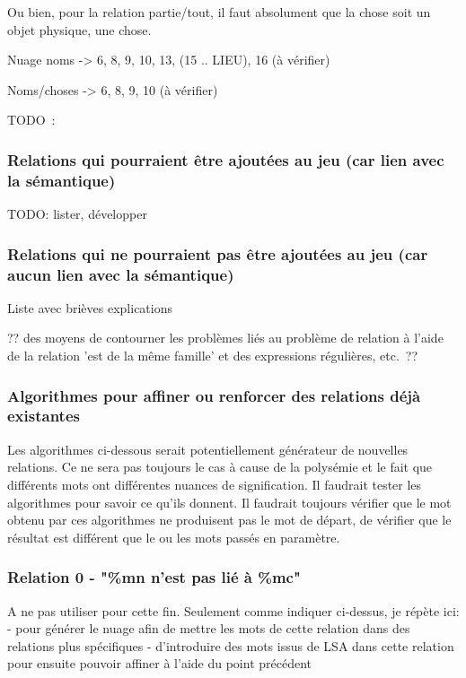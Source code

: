 \documentclass[a4paper,11pt,french]{article}
\begin{document}
Ou bien, pour la relation partie/tout, il faut absolument que la chose soit un objet physique, une chose. 

Nuage noms -> 6, 8, 9, 10, 13, (15 .. LIEU), 16 (à vérifier)

Noms/choses -> 6, 8, 9, 10 (à vérifier)



TODO~: 

\subsubsection{Relations qui pourraient être ajoutées au jeu (car lien avec la sémantique)}
TODO: lister, développer

\subsubsection{Relations qui ne pourraient pas être ajoutées au jeu (car aucun lien avec la sémantique)}
Liste avec brièves explications

?? des moyens de contourner les problèmes liés au problème de relation à l'aide de la relation 'est de la même famille' et des expressions régulières, etc.~??



\subsubsection{Algorithmes pour affiner ou renforcer des relations déjà existantes}

Les algorithmes ci-dessous serait potentiellement générateur de nouvelles relations. Ce ne sera pas toujours le cas à cause de la polysémie et le fait que différents mots ont différentes nuances de signification. Il faudrait tester les algorithmes pour savoir ce qu'ils donnent. Il faudrait toujours vérifier que le mot obtenu par ces algorithmes ne produisent pas le mot de départ, de vérifier que le résultat est différent que le ou les mots passés en paramètre. 

\subsubsection{Relation 0 - "\%mn n'est pas lié à \%mc"}
A ne pas utiliser pour cette fin. Seulement comme indiquer ci-dessus, je répète ici: 
- pour générer le nuage afin de mettre les mots de cette relation dans des relations plus spécifiques
- d'introduire des mots issus de LSA dans cette relation pour ensuite pouvoir affiner à l'aide du point précédent
\end{document}
